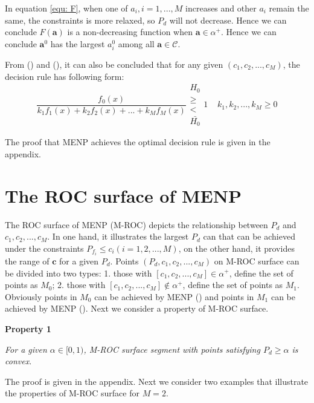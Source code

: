 \documentclass[12pt,journal,a4paper,twoside,onecolumn,draft]{IEEEtran}
\newcommand{\rmnum}[1]{\romannumeral #1}
\begin{document}
\begin{spacing}{2.5}
In equation \eqref{equ: F}, when one of $a_i, i = 1, ..., M$ increases and other $a_i$ remain the same, the constraints is more relaxed, so $P_d$ will not decrease. Hence we can conclude $F(\mathbf{a})$ is a non-decreasing function when $\mathbf{a} \in \alpha^+$. Hence we can conclude $\mathbf{a}^0$ has the largest $a_i^0$ among all $\mathbf{a} \in \mathcal{C}$.

From (\rmnum{1}) and (\rmnum{2}), it can also be concluded that for any given $(c_1, c_2, ..., c_M)$, the decision rule has following form:
\begin{equation}
\frac{f_0(x)}{k_1f_1(x)+k_2f_2(x)+ ... + k_Mf_M(x)} \substack{H_0 \\ \geq \\ < \\ \bar{H_0}} 1\;\;\;\;k_1, k_2, ..., k_M \geq 0
\end{equation}

The proof that MENP achieves the optimal decision rule is given in the appendix.

\section{The ROC surface of MENP}

The ROC surface of MENP (M-ROC) depicts the relationship between $P_d$ and $c_1, c_2, ..., c_M$. In one hand, it  illustrates the largest $P_d$ can that can be achieved under the constraints $P_{f_i} \leq c_i (i = 1, 2, ..., M)$, on the other hand, it provides the range of $\mathbf{c}$ for a given $P_d$.
Points $(P_d, c_1, c_2, ..., c_M)$ on M-ROC  surface can be divided into two types: 1.  those with $[c_1, c_2, ..., c_M] \in \alpha^+$, define the set of points as $M_0$; 2. those with $[c_1, c_2, ..., c_M] \notin \alpha^+$, define the set of points as $M_1$. Obviously points in $M_0$ can be achieved by MENP (\rmnum{1}) and points in $M_1$ can  be achieved by MENP (\rmnum{2}). Next we consider a property of M-ROC surface.

\noindent\textbf{Property 1}

\noindent  \textit{
\noindent For a given $\alpha \in [0,1)$,  M-ROC surface segment with points satisfying $P_d \geq \alpha$ is  convex.
}

The proof is given in the appendix.
Next we consider two examples that illustrate the properties of M-ROC surface for $M = 2$.


\end{spacing}
\end{document}
